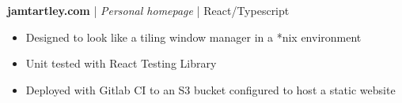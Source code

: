 \textbf{jamtartley.com} | \textit{Personal homepage} | {React/Typescript}
\begin{itemize}
    \item Designed to look like a tiling window manager in a *nix environment
    \item Unit tested with React Testing Library
    \item Deployed with Gitlab CI to an S3 bucket configured to host a static website
\end{itemize}
